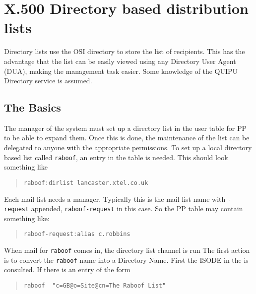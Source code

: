 \section{X.500 Directory based distribution lists}

\newcommand{\option}[1]{``\verb|#1|''}

Directory lists use the OSI directory to store the list of recipients.
This has the advantage that the list can be easily viewed using any
Directory User Agent (DUA), making the management task easier.  
Some knowledge of the QUIPU Directory service is assumed.


\subsection {The Basics}

The manager of the system must set up a directory list in the user
table for PP to be able to expand them. Once this is done, the
maintenance of the list can be delegated to anyone with the
appropriate permissions.  To set up a local directory based list
called \verb+raboof+, an entry in the  table is needed.
This should look something like

\begin{quote}\begin{verbatim}
raboof:dirlist lancaster.xtel.co.uk
\end{verbatim}\end{quote}

Each mail list needs a manager.  Typically this is the mail list name
with \verb+-request+ appended, \verb+raboof-request+ in this case.
So the PP  table may contain something like:

\begin{quote}\begin{verbatim}
raboof-request:alias c.robbins
\end{verbatim}\end{quote}

When mail for \verb+raboof+ comes in, the directory list channel is run
The first action is to convert the \verb+raboof+ name into a Directory Name.
First the ISODE  in the  is consulted.  If
there is an entry of the form

\begin{quote}\begin{verbatim}
raboof  "c=GB@o=Site@cn=The Raboof List"
\end{verbatim}\end{quote}

